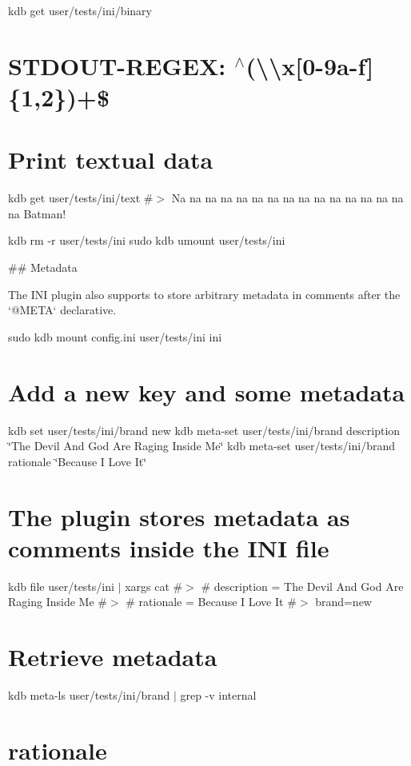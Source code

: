 kdb get user/tests/ini/binary \hypertarget{autotoc_md289_autotoc_md303}{}\section{S\+T\+D\+O\+U\+T-\/\+R\+E\+G\+E\+X\+: $^\wedge$(\textbackslash{}\textbackslash{}x\mbox{[}0-\/9a-\/f\mbox{]}\{1,2\})+\$}\label{autotoc_md289_autotoc_md303}
\hypertarget{autotoc_md289_autotoc_md304}{}\section{Print textual data}\label{autotoc_md289_autotoc_md304}
kdb get user/tests/ini/text \#$>$ Na na na na na na na na na na na na na na na na Batman!

kdb rm -\/r user/tests/ini sudo kdb umount user/tests/ini 
\begin{DoxyCode}
## Metadata

The INI plugin also supports to store arbitrary metadata in comments after the `@META` declarative.
\end{DoxyCode}
 sudo kdb mount config.\+ini user/tests/ini ini\hypertarget{autotoc_md289_autotoc_md305}{}\section{Add a new key and some metadata}\label{autotoc_md289_autotoc_md305}
kdb set user/tests/ini/brand new kdb meta-\/set user/tests/ini/brand description \char`\"{}\+The Devil And God Are Raging Inside Me\char`\"{} kdb meta-\/set user/tests/ini/brand rationale \char`\"{}\+Because I Love It\char`\"{}\hypertarget{autotoc_md289_autotoc_md306}{}\section{The plugin stores metadata as comments inside the I\+N\+I file}\label{autotoc_md289_autotoc_md306}
kdb file user/tests/ini $\vert$ xargs cat \#$>$ \# description = The Devil And God Are Raging Inside Me \#$>$ \# rationale = Because I Love It \#$>$ brand=new\hypertarget{autotoc_md289_autotoc_md307}{}\section{Retrieve metadata}\label{autotoc_md289_autotoc_md307}
kdb meta-\/ls user/tests/ini/brand $\vert$ grep -\/v \textquotesingle{}internal\textquotesingle{} \hypertarget{autotoc_md289_autotoc_md308}{}\section{rationale}\label{autotoc_md289_autotoc_md308}
